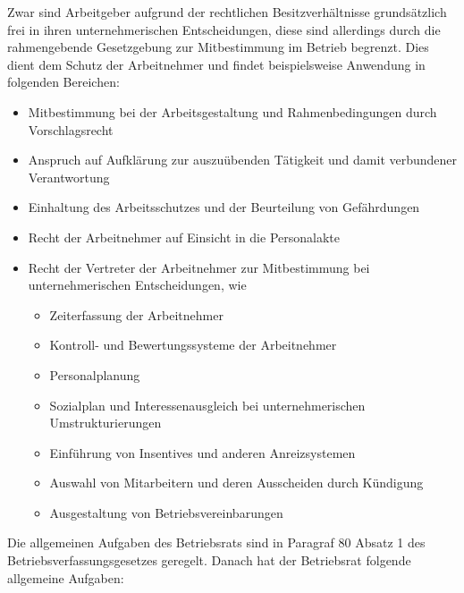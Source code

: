 Zwar sind Arbeitgeber aufgrund der rechtlichen Besitzverhältnisse grundsätzlich frei in ihren unternehmerischen Entscheidungen, diese sind allerdings durch die rahmengebende Gesetzgebung zur Mitbestimmung im Betrieb begrenzt. Dies dient dem Schutz der Arbeitnehmer und findet beispielsweise Anwendung in folgenden Bereichen: 
\newline
\begin{itemize}
	\item Mitbestimmung bei der Arbeitsgestaltung und Rahmenbedingungen durch Vorschlagsrecht
	\item Anspruch auf Aufklärung zur auszuübenden Tätigkeit und damit verbundener Verantwortung
	\item Einhaltung des Arbeitsschutzes und der Beurteilung von Gefährdungen
	\item Recht der Arbeitnehmer auf Einsicht in die Personalakte
	\item Recht der Vertreter der Arbeitnehmer zur Mitbestimmung bei unternehmerischen Entscheidungen, wie
	\begin{itemize}
		\item Zeiterfassung der Arbeitnehmer
		\item Kontroll- und Bewertungssysteme der Arbeitnehmer
		\item Personalplanung
		\item Sozialplan und Interessenausgleich bei unternehmerischen Umstrukturierungen
		\item Einführung von Insentives und anderen Anreizsystemen
		\item Auswahl von Mitarbeitern und deren Ausscheiden durch Kündigung
		\item Ausgestaltung von Betriebsvereinbarungen
	\end{itemize}
\end{itemize}
Die allgemeinen Aufgaben des Betriebsrats sind in Paragraf 80 Absatz 1 des Betriebsverfassungsgesetzes geregelt. Danach hat der Betriebsrat folgende allgemeine Aufgaben:
